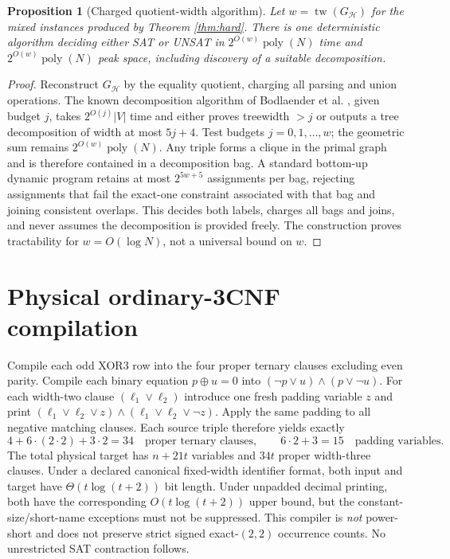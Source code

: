 \documentclass[11pt]{article}
\newtheorem{proposition}[theorem]{Proposition}
\begin{document}
\begin{proposition}[Charged quotient-width algorithm]\label{prop:fpt}
Let $w=\operatorname{tw}(G_{\mathcal H})$ for the mixed instances produced by Theorem \ref{thm:hard}. There is one deterministic algorithm deciding either SAT or UNSAT in $2^{O(w)}\operatorname{poly}(N)$ time and $2^{O(w)}\operatorname{poly}(N)$ peak space, including discovery of a suitable decomposition.
\end{proposition}
\begin{proof}
Reconstruct $G_{\mathcal H}$ by the equality quotient, charging all parsing and union operations. The known decomposition algorithm of Bodlaender et al. \cite{bdetal}, given budget $j$, takes $2^{O(j)}|V|$ time and either proves treewidth $>j$ or outputs a tree decomposition of width at most $5j+4$. Test budgets $j=0,1,\ldots,w$; the geometric sum remains $2^{O(w)}\operatorname{poly}(N)$. Any triple forms a clique in the primal graph and is therefore contained in a decomposition bag. A standard bottom-up dynamic program retains at most $2^{5w+5}$ assignments per bag, rejecting assignments that fail the exact-one constraint associated with that bag and joining consistent overlaps. This decides both labels, charges all bags and joins, and never assumes the decomposition is provided freely. The construction proves tractability for $w=O(\log N)$, not a universal bound on $w$.
\end{proof}

\section{Physical ordinary-3CNF compilation}
Compile each odd XOR3 row into the four proper ternary clauses excluding even parity. Compile each binary equation $p\oplus u=0$ into $(\neg p\vee u)\wedge(p\vee\neg u)$. For each width-two clause $(\ell_1\vee\ell_2)$ introduce one fresh padding variable $z$ and print $(\ell_1\vee\ell_2\vee z)\wedge(\ell_1\vee\ell_2\vee\neg z)$. Apply the same padding to all negative matching clauses. Each source triple therefore yields exactly
\[
 4 + 6\cdot(2\cdot2)+3\cdot2=34
 \quad\text{proper ternary clauses},\qquad
 6\cdot2+3=15\quad\text{padding variables}.
\]
The total physical target has $n+21t$ variables and $34t$ proper width-three clauses. Under a declared canonical fixed-width identifier format, both input and target have $\Theta(t\log(t+2))$ bit length. Under unpadded decimal printing, both have the corresponding $O(t\log(t+2))$ upper bound, but the constant-size/short-name exceptions must not be suppressed. This compiler is \emph{not} power-short and does not preserve strict signed exact-$(2,2)$ occurrence counts. No unrestricted SAT contraction follows.
\end{document}
